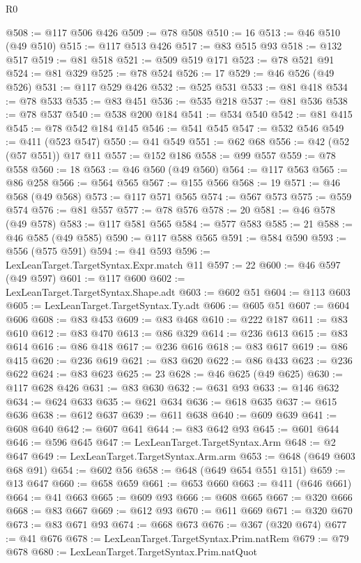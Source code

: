 \begin{lexlean}{R0}
\begin{coremodule}
@508 := @117 @506 @426
@509 := @78 @508
@510 := 16
@513 := @46 @510 (@49 @510)
@515 := @117 @513 @426
@517 := @83 @515 @93
@518 := @132 @517
@519 := @81 @518
@521 := @509 @519 @171
@523 := @78 @521 @91
@524 := @81 @329
@525 := @78 @524
@526 := 17
@529 := @46 @526 (@49 @526)
@531 := @117 @529 @426
@532 := @525 @531
@533 := @81 @418
@534 := @78 @533
@535 := @83 @451
@536 := @535 @218
@537 := @81 @536
@538 := @78 @537
@540 := @538 @200 @184
@541 := @534 @540
@542 := @81 @415
@545 := @78 @542 @184 @145
@546 := @541 @545
@547 := @532 @546
@549 := @411 (@523 @547)
@550 := @41 @549
@551 := @62 @68
@556 := @42 (@52 (@57 @551)) @17 @11
@557 := @152 @186
@558 := @99 @557
@559 := @78 @558
@560 := 18
@563 := @46 @560 (@49 @560)
@564 := @117 @563
@565 := @86 @258
@566 := @564 @565
@567 := @155 @566
@568 := 19
@571 := @46 @568 (@49 @568)
@573 := @117 @571 @565
@574 := @567 @573
@575 := @559 @574
@576 := @81 @557
@577 := @78 @576
@578 := 20
@581 := @46 @578 (@49 @578)
@583 := @117 @581 @565
@584 := @577 @583
@585 := 21
@588 := @46 @585 (@49 @585)
@590 := @117 @588 @565
@591 := @584 @590
@593 := @556 (@575 @591)
@594 := @41 @593
@596 := LexLeanTarget.TargetSyntax.Expr.match @11
@597 := 22
@600 := @46 @597 (@49 @597)
@601 := @117 @600
@602 := LexLeanTarget.TargetSyntax.Shape.adt
@603 := @602 @51
@604 := @113 @603
@605 := LexLeanTarget.TargetSyntax.Ty.adt
@606 := @605 @51
@607 := @604 @606
@608 := @83 @453
@609 := @83 @468
@610 := @222 @187
@611 := @83 @610
@612 := @83 @470
@613 := @86 @329
@614 := @236 @613
@615 := @83 @614
@616 := @86 @418
@617 := @236 @616
@618 := @83 @617
@619 := @86 @415
@620 := @236 @619
@621 := @83 @620
@622 := @86 @433
@623 := @236 @622
@624 := @83 @623
@625 := 23
@628 := @46 @625 (@49 @625)
@630 := @117 @628 @426
@631 := @83 @630
@632 := @631 @93
@633 := @146 @632
@634 := @624 @633
@635 := @621 @634
@636 := @618 @635
@637 := @615 @636
@638 := @612 @637
@639 := @611 @638
@640 := @609 @639
@641 := @608 @640
@642 := @607 @641
@644 := @83 @642 @93
@645 := @601 @644
@646 := @596 @645
@647 := LexLeanTarget.TargetSyntax.Arm
@648 := @2 @647
@649 := LexLeanTarget.TargetSyntax.Arm.arm
@653 := @648 (@649 @603 @68 @91)
@654 := @602 @56
@658 := @648 (@649 @654 @551 @151)
@659 := @13 @647
@660 := @658 @659
@661 := @653 @660
@663 := @411 (@646 @661)
@664 := @41 @663
@665 := @609 @93
@666 := @608 @665
@667 := @320 @666
@668 := @83 @667
@669 := @612 @93
@670 := @611 @669
@671 := @320 @670
@673 := @83 @671 @93
@674 := @668 @673
@676 := @367 (@320 @674)
@677 := @41 @676
@678 := LexLeanTarget.TargetSyntax.Prim.natRem
@679 := @79 @678
@680 := LexLeanTarget.TargetSyntax.Prim.natQuot

\end{coremodule}
\end{lexlean}
